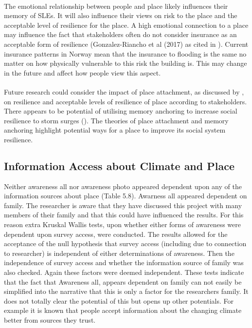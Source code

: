 \paragraph{}

The emotional relationship between people and place likely influences their memory of SLEs. It will also influence their views on risk to the place and the acceptable level of resilience for the place. A high emotional connection to a place may influence the fact that stakeholders often do not consider insurance as an acceptable form of resilience (Gonzalez-Riancho et al (2017) as cited in \cite{gerkensmeier_governing_2018}). Current insurance patterns in Norway mean that the insurance to flooding is the same no matter on how physically vulnerable to this risk the building is. This may change in the future and affect how people view this aspect.
\paragraph{}
Future research could consider the impact of place attachment, as discussed by \cite{ariccio_place_2021}, on resilience and acceptable levels of resilience of place according to stakeholders. There appears to be potential of utilising memory anchoring to increase social resilience to storm surges (\cite{de_guttry_expiry_2022}).  The theories of place attachment and memory anchoring highlight potential ways for a place to improve its social system resilience. 


\subsection{Information Access about Climate and Place}
Neither awareness all nor awareness photo appeared dependent upon any of the information sources about place  (Table 5.8). Awarness all appeared dependent on family. The researcher is aware that they have discussed this project with many members of their family and that this could have influenced the results. For this reason extra Kruskal Wallis tests, upon whether either forms of awareness were dependent upon survey access, were conducted. The results allowed for the acceptance of the null hypothesis that survey access (including due to connection to researcher) is independent of either determinations of awareness. Then the independence of survey access and whether the information source of family was also checked. Again these factors were deemed independent. These tests indicate that the fact that Awareness all, appears dependent on family can not easily be simplified into the narrative that this is only a factor for the researchers family. It does not totally clear the potential of this but opens up other potentials. For example it is known that people accept information about the changing climate better from sources they trust. 
